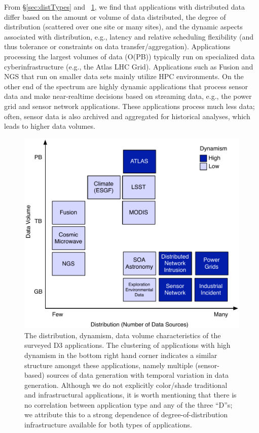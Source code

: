 From \S\ref{sec:distTypes} and
\figurename~\ref{fig:figures_application}, we find that applications
with distributed data differ based on the amount or volume of data
distributed, the degree of distribution (scattered over one site or
many sites), and the dynamic aspects associated with distribution,
e.g., latency and relative scheduling flexibility (and thus tolerance
or constraints on data transfer/aggregation).  Applications processing
the largest volumes of data (O(PB)) typically run on specialized data
cyberinfrastructure (e.g., the Atlas LHC Grid). Applications such as
Fusion and NGS that run on smaller data sets mainly utilize HPC
environments. On the other end of the spectrum are highly dynamic
applications that process sensor data and make near-realtime
decisions based on streaming data, e.g., the power grid and sensor
network applications. These applications process much less data;
often, sensor data is also archived and aggregated for historical
analyses, which leads to higher data volumes. 

\begin{figure}[ht]
	\centering
		\includegraphics[width=.7\textwidth]{figures/application.pdf}
                \caption{The distribution, dynamism, data volume
                  characteristics of the surveyed D3 applications. The
                  clustering of applications with high dynamism in the
                  bottom right hand corner indicates a similar
                  structure amongst these applications, namely
                  multiple (sensor-based) sources of data
                  generation with temporal variation in data
                  generation. Although we do not explicitly
                  color/shade traditional and infrastructural
                  applications, it is worth mentioning that there is
                  no correlation between application type and any of
                  the three ``D''s; we attribute this to a strong
                  dependence of degree-of-distribution infrastructure
                  available for both types of applications.
                  \label{fig:figures_application}}
\end{figure}


